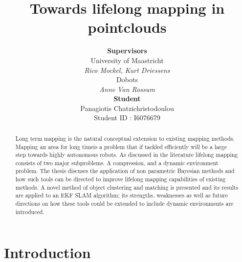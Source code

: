 \documentclass[twoside,hidelinks]{article}
\title{\vspace{-15mm}\fontsize{24pt}{10pt}\selectfont\textbf{{Towards lifelong mapping in pointclouds}}} %
\author{
\large
\normalsize \textbf{Supervisors} \\ 
\normalsize University of Maastricht \\ %
\normalsize \textit{Rico Mockel, Kurt Driessens} \\
\normalsize Dobots \\
\normalsize \textit{Anne Van Rossum} \\
\normalsize \textbf{Student} \\
\normalsize Panagiotis Chatzichristodoulou \\
\normalsize Student ID : I6076679
\vspace{-5mm}
}
\date{}
\begin{document}
\maketitle %

\thispagestyle{fancy} %


 
\begin{abstract}

\noindent Long term mapping is the natural conceptual extension to existing mapping methods. Mapping an area for long timeis a problem that if tackled efficiently will be a large step towards highly autonomous robots. As discussed in the literature lifelong mapping consists of two major subproblems. A compression, and a dynamic environment problem. The thesis discuses the application of non parametric Bayesian methods and how such tools can be directed to improve lifelong mapping capabilities of existing methods. A novel method of object clustering and matching is presented and its results are applied to an EKF SLAM algorithm; its strengths, weaknesses as well as future directions on how these tools could be extended to include dynamic environments are introduced.


\end{abstract}

\newpage
\thispagestyle{empty}
 
\tableofcontents

\listoffigures
 
\listoftables
 
\newpage


\section{Introduction}
\end{document}
